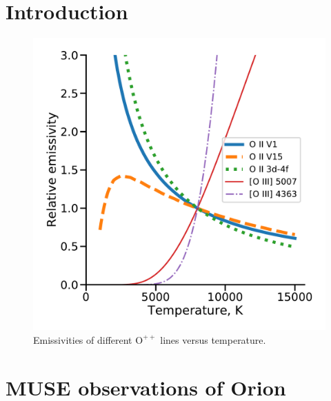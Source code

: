 \documentclass[useAMS, usenatbib]{mnras}
\newcommand*\chem[1]{\ensuremath{\mathrm{#1}}}
\begin{document}
\section{Introduction}
\label{sec:introduction}


\begin{figure}
  \centering
  \includegraphics[width=\linewidth]{figs/oii-emissivity-vs-t}
  \caption{Emissivities of different \chem{O^{++}} lines versus temperature.}
  \label{fig:emissivities}
\end{figure}




\section{MUSE observations of Orion}
\label{sec:muse-observ-orion}
\end{document}
